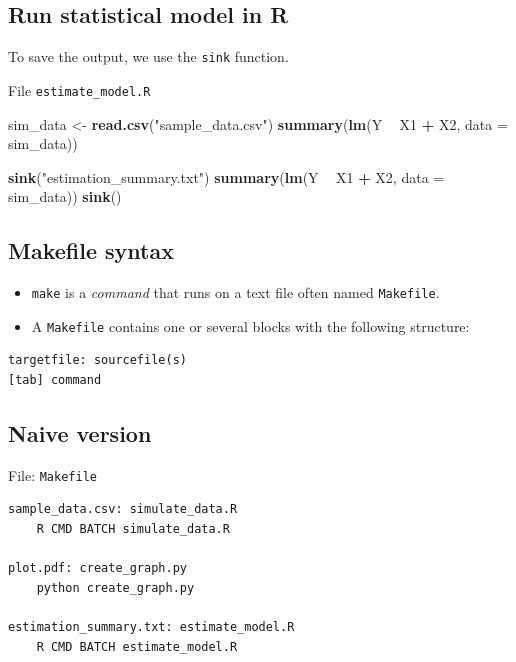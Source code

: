 \documentclass[]{book}
\newenvironment{Shaded}{\begin{snugshade}}{\end{snugshade}}
\newcommand{\KeywordTok}[1]{\textcolor[rgb]{0.13,0.29,0.53}{\textbf{#1}}}
\newcommand{\DataTypeTok}[1]{\textcolor[rgb]{0.13,0.29,0.53}{#1}}
\newcommand{\StringTok}[1]{\textcolor[rgb]{0.31,0.60,0.02}{#1}}
\newcommand{\OperatorTok}[1]{\textcolor[rgb]{0.81,0.36,0.00}{\textbf{#1}}}
\newcommand{\NormalTok}[1]{#1}
\theoremstyle{definition}
\theoremstyle{definition}
\theoremstyle{definition}
\theoremstyle{remark}
\begin{document}
\subsection{Run statistical model in
R}\label{run-statistical-model-in-r-1}

To save the output, we use the \texttt{sink} function.

File \texttt{estimate\_model.R}

\begin{Shaded}
\begin{Highlighting}[]
\NormalTok{sim_data <-}\StringTok{ }\KeywordTok{read.csv}\NormalTok{(}\StringTok{"sample_data.csv"}\NormalTok{)}
\KeywordTok{summary}\NormalTok{(}\KeywordTok{lm}\NormalTok{(Y }\OperatorTok{~}\StringTok{ }\NormalTok{X1 }\OperatorTok{+}\StringTok{ }\NormalTok{X2, }\DataTypeTok{data =}\NormalTok{ sim_data))}

\KeywordTok{sink}\NormalTok{(}\StringTok{"estimation_summary.txt"}\NormalTok{)}
\KeywordTok{summary}\NormalTok{(}\KeywordTok{lm}\NormalTok{(Y }\OperatorTok{~}\StringTok{ }\NormalTok{X1 }\OperatorTok{+}\StringTok{ }\NormalTok{X2, }\DataTypeTok{data =}\NormalTok{ sim_data))}
\KeywordTok{sink}\NormalTok{()}
\end{Highlighting}
\end{Shaded}

\subsection{Makefile syntax}\label{makefile-syntax}

\begin{itemize}
\item
  \texttt{make} is a \emph{command} that runs on a text file often named
  \texttt{Makefile}.
\item
  A \texttt{Makefile} contains one or several blocks with the following
  structure:
\end{itemize}

\begin{verbatim}
targetfile: sourcefile(s)
[tab] command
\end{verbatim}

\subsection{Naive version}\label{naive-version}

File: \texttt{Makefile}

\begin{verbatim}
sample_data.csv: simulate_data.R
    R CMD BATCH simulate_data.R

plot.pdf: create_graph.py
    python create_graph.py

estimation_summary.txt: estimate_model.R
    R CMD BATCH estimate_model.R
\end{verbatim}
\end{document}
